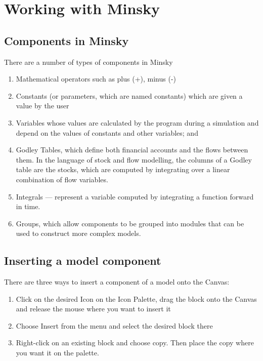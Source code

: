 \section{Working with Minsky}

\subsection{Components in Minsky}

There are a number of types of components in Minsky
\begin{enumerate}
\item Mathematical operators such as plus (+), minus (-)
\item Constants (or parameters, which are named constants) which are
given a value by the user 
\item Variables whose values are calculated by the program during a simulation and depend on the values of constants and other variables; and
\item Godley Tables, which define both financial accounts and the
flows between them. In the language of stock and flow modelling, the
columns of a Godley table are the stocks, which are computed by
integrating over a linear combination of flow variables.
\item Integrals --- represent a variable computed by integrating a
function forward in time.
\item Groups, which allow components to be grouped into modules that
can be used to construct more complex models.
\end{enumerate}


\subsection{Inserting a model component}


There are three ways to insert a component of a model onto the Canvas:
\begin{enumerate}
\item Click on the desired Icon on the Icon Palette, drag the block
onto the Canvas and release the mouse where you want to insert it 

\begin{center}
\end{center}

\item Choose Insert from the menu and select the desired block there

  \begin{center}
  \end{center}
  \newpage
  
\item Right-click on an existing block and choose copy. Then place the
copy where you want it on the palette. 

\begin{center}
\end{center}


\end{enumerate}

